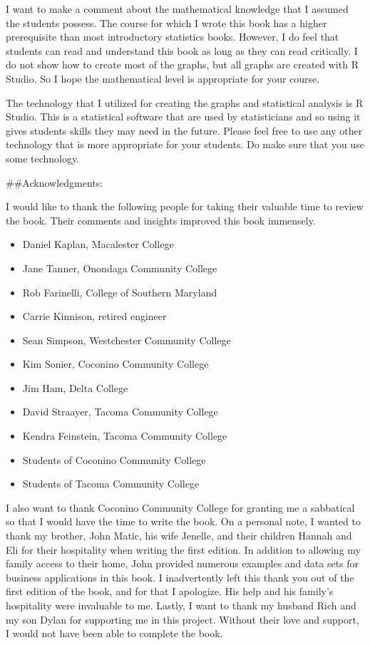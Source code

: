 \documentclass[]{book}
\providecommand{\tightlist}{%
  \setlength{\itemsep}{0pt}\setlength{\parskip}{0pt}}
\begin{document}
I want to make a comment about the mathematical knowledge that I assumed the students possess. The course for which I wrote this book has a higher prerequisite than most introductory statistics books. However, I do feel that students can read and understand this book as long as they can read critically. I do not show how to create most of the graphs, but all graphs are created with R Studio. So I hope the mathematical level is appropriate for your course.

The technology that I utilized for creating the graphs and statistical analysis is R Studio. This is a statistical software that are used by statisticians and so using it gives students skills they may need in the future. Please feel free to use any other technology that is more appropriate for your students. Do make sure that you use some technology.

\#\#Acknowledgments:

I would like to thank the following people for taking their valuable time to review the book. Their comments and insights improved this book immensely.

\begin{itemize}
\tightlist
\item
  Daniel Kaplan, Macalester College
\item
  Jane Tanner, Onondaga Community College
\item
  Rob Farinelli, College of Southern Maryland
\item
  Carrie Kinnison, retired engineer
\item
  Sean Simpson, Westchester Community College
\item
  Kim Sonier, Coconino Community College
\item
  Jim Ham, Delta College
\item
  David Straayer, Tacoma Community College
\item
  Kendra Feinstein, Tacoma Community College
\item
  Students of Coconino Community College
\item
  Students of Tacoma Community College
\end{itemize}

I also want to thank Coconino Community College for granting me a sabbatical so that I would have the time to write the book. On a personal note, I wanted to thank my brother, John Matic, his wife Jenelle, and their children Hannah and Eli for their hospitality when writing the first edition. In addition to allowing my family access to their home, John provided numerous examples and data sets for business applications in this book. I inadvertently left this thank you out of the first edition of the book, and for that I apologize. His help and his family's hospitality were invaluable to me.
Lastly, I want to thank my husband Rich and my son Dylan for supporting me in this project. Without their love and support, I would not have been able to complete the book.
\end{document}
